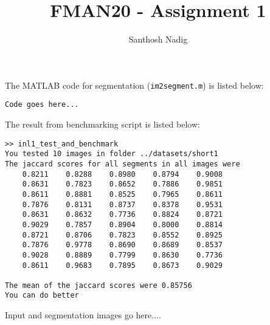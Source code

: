 \documentclass[11pt]{article} %
\title{FMAN20 - Assignment 1}
\author{Santhosh Nadig}
\begin{document}
\maketitle

\section{}

\section{}

\section{}

\section{}

\section{}

\section{}

\section{}

The MATLAB code for segmentation (\texttt{im2segment.m}) is listed below:
\begin{verbatim}
Code goes here...
\end{verbatim}

The result from benchmarking script is listed below:
\begin{verbatim}
>> inl1_test_and_benchmark
You tested 10 images in folder ../datasets/short1
The jaccard scores for all segments in all images were
    0.8211    0.8288    0.8980    0.8794    0.9008
    0.8631    0.7823    0.8652    0.7886    0.9851
    0.8611    0.8881    0.8525    0.7965    0.8611
    0.7876    0.8131    0.8737    0.8378    0.9531
    0.8631    0.8632    0.7736    0.8824    0.8721
    0.9029    0.7857    0.8904    0.8000    0.8814
    0.8721    0.8706    0.7823    0.8552    0.8925
    0.7876    0.9778    0.8690    0.8689    0.8537
    0.9028    0.8889    0.7799    0.8630    0.7736
    0.8611    0.9683    0.7895    0.8673    0.9029

The mean of the jaccard scores were 0.85756
You can do better
\end{verbatim}

Input and segmentation images go here....

\section{}
\end{document}
